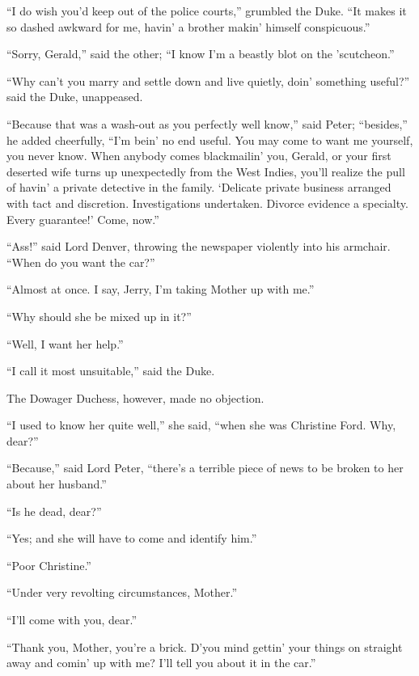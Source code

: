 \enquote{I do wish you’d keep out of the police courts,} grumbled the Duke. \enquote{It makes it so dashed awkward for me, havin’ a brother makin’ himself conspicuous.}

\enquote{Sorry, Gerald,} said the other; \enquote{I know I’m a beastly blot on the ’scutcheon.}

\enquote{Why can’t you marry and settle down and live quietly, doin’ something useful?} said the Duke, unappeased.

\enquote{Because that was a wash-out as you perfectly well know,} said Peter; \enquote{besides,} he added cheerfully, \enquote{I’m bein’ no end useful. You may come to want me yourself, you never know. When anybody comes blackmailin’ you, Gerald, or your first deserted wife turns up unexpectedly from the West Indies, you’ll realize the pull of havin’ a private detective in the family. \enquote{Delicate private business arranged with tact and discretion. Investigations undertaken. Divorce evidence a specialty. Every guarantee!} Come, now.}

\enquote{Ass!} said Lord Denver, throwing the newspaper violently into his armchair. \enquote{When do you want the car?}

\enquote{Almost at once. I say, Jerry, I’m taking Mother up with me.}

\enquote{Why should she be mixed up in it?}

\enquote{Well, I want her help.}

\enquote{I call it most unsuitable,} said the Duke.

The Dowager Duchess, however, made no objection.

\enquote{I used to know her quite well,} she said, \enquote{when she was Christine Ford. Why, dear?}

\enquote{Because,} said Lord Peter, \enquote{there’s a terrible piece of news to be broken to her about her husband.}

\enquote{Is he dead, dear?}

\enquote{Yes; and she will have to come and identify him.}

\enquote{Poor Christine.}

\enquote{Under very revolting circumstances, Mother.}

\enquote{I’ll come with you, dear.}

\enquote{Thank you, Mother, you’re a brick. D’you mind gettin’ your things on straight away and comin’ up with me? I’ll tell you about it in the car.}